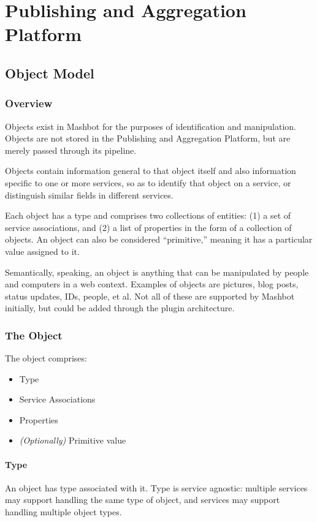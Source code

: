 \documentclass{report}
\begin{document}
\chapter{Publishing and Aggregation Platform}
	\section{Object Model}
		\subsection{Overview}
			Objects exist in Mashbot for the purposes of identification and 
			manipulation. Objects are not stored in the Publishing and 
			Aggregation Platform, but are merely passed through its pipeline.

			Objects contain information general to that object itself and also 
			information specific to one or more services, so as to
			identify that object on a service, or distinguish similar fields in 
			different services.

			Each object has a type and comprises two collections of entities:
			(1) a set of service associations, and (2) a list of properties in 
			the form of a collection of objects.  An object can also be 
			considered ``primitive,'' meaning it has a particular value 
			assigned to it.

			Semantically, speaking, an object is anything that can be 
			manipulated by people and computers in a web context.  Examples of 
			objects are pictures, blog posts, status updates, IDs, people, et 
			al.  Not all of these are supported by Mashbot initially, but could 
			be added through the plugin architecture.

		\subsection{The Object}
			The object comprises:
			\begin{itemize}
			\item Type
			\item Service Associations
			\item Properties
			\item \emph{(Optionally)} Primitive value
			\end{itemize}

		\subsubsection{Type}
			An object has type associated with it. Type is service agnostic:
			multiple services may support handling the same type of object,
			and services may support handling multiple object types.
\end{document}
